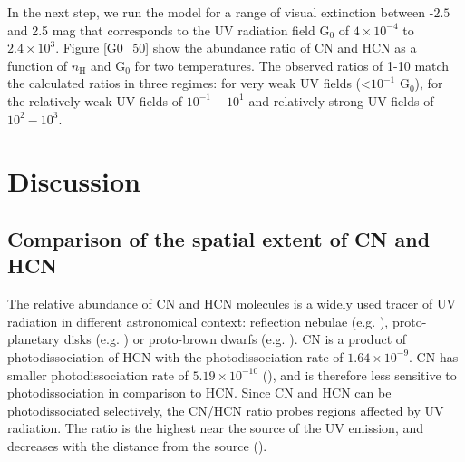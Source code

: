 \documentclass{aa}
\begin{document}
In the next step, we run the model for a
range of visual extinction between -$2.5$ and 2.5 mag that corresponds to
the UV radiation field G$_0$ of $4\times 10^{-4}$ to $2.4\times 10^{3}$. 
Figure \ref{G0_50} show the abundance ratio of CN and HCN as a function of
$n_\mathrm{H}$ and G$_0$ for two temperatures. The observed ratios 
of 1-10 match the calculated ratios in three regimes: for very weak UV fields (<$10^{-1}$ G$_0$),
for the relatively weak UV fields of $10^{-1}-10^1$ and relatively strong UV fields of $10^{2}-10^3$.

%
\section{Discussion}
\label{section:discussion}

\subsection{Comparison of the spatial extent of CN and HCN}
\label{subsection:extent}

The relative abundance of CN and HCN molecules is a widely used tracer of UV radiation in different
astronomical context: reflection nebulae (e.g. \citealt{Fue95}), proto-planetary disks (e.g.
\citealt{Cha12}) or proto-brown dwarfs (e.g. \citealt{Ria18}). CN is a product of photodissociation of
HCN with the photodissociation rate of $1.64\times10^{-9}$. CN has smaller photodissociation rate of
$5.19\times10^{-10}$ (\citealt{Hea17}), and is therefore less sensitive to photodissociation in comparison to HCN.
Since CN and HCN can be photodissociated selectively, the CN/HCN ratio probes regions
affected by UV radiation. The ratio is the highest near the source of the UV emission, and decreases
with the distance from the source (\citealt{Fue93}). 
\end{document}

